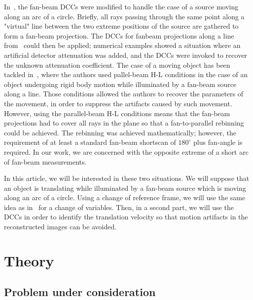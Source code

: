 \documentclass[twocolumn]{IEEEtran}
\begin{document}
In~\cite{clackdoyle2015consistency}, the fan-beam DCCs were modified to handle the case of a source moving along an arc of a circle. Briefly, all rays passing through the same point along a "virtual" line between the two extreme positions of the source are gathered to form a fan-beam projection. The DCCs for fanbeam projections along a line from~\cite{clackdoyle2013necessary} could then be applied; numerical examples showed a situation where an artificial detector attenuation was added, and the DCCs were invoked to recover the unknown attenuation coefficient. The case of a moving object has been tackled in~\cite{yu2006data,yu2007data}, where the authors used pallel-beam H-L conditions in the case of an object undergoing rigid body motion while illuminated by a fan-beam source along a line. Those conditions allowed the authors to recover the parameters of the movement, in order to suppress the artifacts caused by such movement.  However, using the parallel-beam H-L conditions means that the fan-beam projections had to cover all rays in the plane so that a fan-to-parallel rebinning could be achieved. The rebinning was achieved mathematically; however, the requirement of at least a standard fan-beam shortscan of $180^{\circ}$ plus fan-angle is required. In our work, we are concerned with the opposite extreme of a short arc of fan-beam measurements.

In this article, we will be interested in these two situations. We will suppose that an object is translating while illuminated by a fan-beam source which is moving along an arc of a circle. Using a change of reference frame, we will use the same idea as in~\cite{clackdoyle2015consistency} for a change of variables. Then, in a second part, we will use the DCCs in order to identify the translation velocity so that motion artifacts in the reconstructed images can be avoided.

\section{Theory} 
\label{sec:theory}

\subsection{Problem under consideration}
\label{sub:problem_under_consideration}
\end{document}

